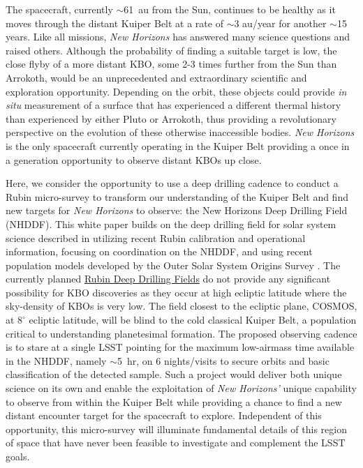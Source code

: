 \documentclass[modern,linenumbers,trackchanges,preprint]{aastex631}
\begin{document}
The spacecraft, currently $\sim$61~au from the Sun, continues to be healthy as it moves through the distant Kuiper Belt at a rate of $\sim$3 au/year for another $\sim$15 years. 
Like all missions, {\it New Horizons} has answered many science questions and raised others. 
Although the probability of finding a suitable target is low, the close flyby of a more distant KBO, some 2-3 times further from the Sun than Arrokoth, would be an unprecedented and extraordinary scientific and exploration opportunity. 
Depending on the orbit, these objects could provide {\it in situ} measurement of a surface that has experienced a different thermal history than experienced by either Pluto or Arrokoth, thus providing a revolutionary perspective on the evolution of these otherwise inaccessible bodies. {\it New Horizons} is the only spacecraft currently operating in the Kuiper Belt providing a once in a generation opportunity to observe distant KBOs up close.

Here, we consider the opportunity to use a deep drilling cadence to conduct a Rubin micro-survey to transform our understanding of the Kuiper Belt and find new targets for {\it New Horizons} to observe: the New Horizons Deep Drilling Field (NHDDF). 
This white paper builds on the deep drilling field for solar system science described in \citet{Trilling18} utilizing recent Rubin calibration and operational information, focusing on coordination on the NHDDF, and using recent population models developed by the Outer Solar System Origins Survey \citep[OSSOS][]{Bannister2018}.
The currently planned \href{https://www.lsst.org/scientists/survey-design/ddf}{Rubin Deep Drilling Fields} do not provide any significant possibility for KBO discoveries as they occur at high ecliptic latitude where the sky-density of KBOs is very low.
The field closest to the ecliptic plane, COSMOS, at $8^\circ$ ecliptic latitude, will be blind to the cold classical Kuiper Belt, a population critical to understanding planetesimal formation.    
The proposed observing cadence is to stare at a single LSST pointing for the maximum low-airmass time available in the NHDDF, namely $\sim$5~hr, on 6 nights/visits to secure orbits and basic classification of the detected sample. 
Such a project would deliver both unique science on its own and enable the exploitation of {\it New Horizons'} unique capability to observe from within the Kuiper Belt while providing a chance to find a new distant encounter target for the spacecraft to explore.
Independent of this opportunity, this micro-survey will illuminate fundamental details of this region of space that have never been feasible to investigate and complement the LSST goals. 
\end{document}
